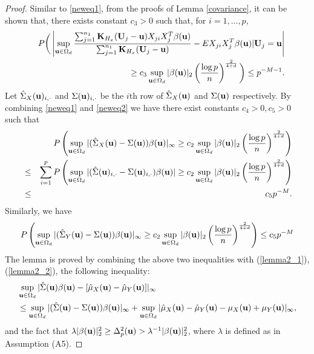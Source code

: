 \documentclass[11pt]{article}
\theoremstyle{definition}
\begin{document}
\begin{proof}
 	Similar to \eqref{neweq1}, from the proofs of Lemma \ref{covariance}, it can be shown that, there exists constant $c_3>0$ such that, for $i=1,\ldots, p$,
 	\begin{eqnarray}\label{neweq2}
 		&&P\bigg(\left| \sup_{{\bf u}\in\Omega_d}\frac{\sum_{j=1}^{n_1}{\bf K}_{H_x}({\bf U}_j-{\bf u})X_{ji}X_j^T\beta({\bf u})}{\sum_{j=1}^{n_1}{\bf K}_{H_x}({\bf U}_j-{\bf u})}- EX_{ji}X_j^T\beta({\bf u})|{\bf U}_j={\bf u}
 		\right|     \\
 		&& \geq
 		c_3\sup_{{\bf u}\in\Omega_d}|\beta({\bf u})|_2\left(\frac{\log p}{n}\right)^{\frac{2}{4+d}} \bigg)   \leq
 		p^{-M-1}.  \nonumber
 	\end{eqnarray}
 	Let $\hat{\Sigma}_X({\bf u})_{i,\cdot}$ and $\Sigma({\bf u})_{i,\cdot}$ be the $i$th row of $\hat{\Sigma}_X({\bf u})$ and $\Sigma({\bf u})$ respectively. By combining \eqref{neweq1} and \eqref{neweq2} we have there exist constants $c_4>0, c_5>0$ such that
 	\begin{eqnarray}\label{lemma2_2}
 		&& P\left(\sup_{{\bf u}\in\Omega_d}|(\hat{\Sigma}_X({\bf u})-\Sigma({\bf u}))\beta({\bf u})|_{\infty}
 		\geq
 		c_2\sup_{{\bf u}\in\Omega_d}|\beta({\bf u})|_2\left(\frac{\log p}{n}\right)^{\frac{2}{4+d}} \right)    \\
 		&\leq& \sum_{i=1}^{p} P\left(\sup_{{\bf u}\in\Omega_d}|(\hat{\Sigma}({\bf u})_{i,\cdot}-\Sigma({\bf u})_{i,\cdot})\beta({\bf u})|
 		\geq
 		c_2\sup_{{\bf u}\in\Omega_d}|\beta({\bf u})|_2\left(\frac{\log p}{n}\right)^{\frac{2}{4+d}} \right)\nonumber \\
 		&\leq& c_5p^{-M}. \nonumber
 	\end{eqnarray}
 	Similarly, we have
 	\begin{eqnarray*}
 		P\left(\sup_{{\bf u}\in\Omega_d}|(\hat{\Sigma}_Y({\bf u})-\Sigma({\bf u}))\beta({\bf u})|_{\infty}
 		\geq
 		c_2\sup_{{\bf u}\in\Omega_d}|\beta({\bf u})|_2\left(\frac{\log p}{n}\right)^{\frac{2}{4+d}} \right)
 		\leq c_5p^{-M}
 	\end{eqnarray*}
 	The lemma is proved by combining the above two inequalities with (\ref{lemma2_1}), (\ref{lemma2_2}), the following inequality:
 	\begin{align*}
 		&\sup_{{\bf u}\in \Omega_d}|\hat{\Sigma}({\bf u})\beta({\bf u})-[\hat{\mu}_X({\bf u})-\hat{\mu}_Y({\bf u})]|_{\infty} \\
 		&\leq
 		\sup_{{\bf u}\in\Omega_d}|(\hat{\Sigma}({\bf u})-\Sigma({\bf u}))\beta({\bf u})|_{\infty}
 		+\sup_{{\bf u}\in \Omega_d}|\hat{\mu}_X({\bf u})-\hat{\mu}_Y({\bf u})-\mu_X({\bf u})+\mu_Y({\bf u})|_{\infty},
 	\end{align*}
 	and the fact that $\lambda|\beta({\bf u})|_2^2\geq   \Delta_{p}^2({\bf u})>\lambda^{-1}|\beta({\bf u})|_2^2$, where $\lambda$ is defined as in Assumption (A5).
 \end{proof}
 
\end{document}
